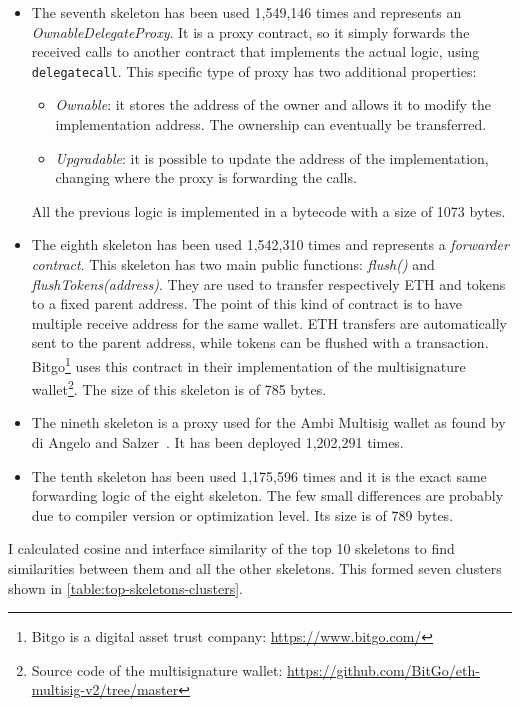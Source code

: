 \begin{itemize}
    \item The seventh skeleton has been used 1,549,146 times and represents an \textit{OwnableDelegateProxy}. It is a proxy contract, so it simply forwards the received calls to another contract that implements the actual logic, using {\tt delegatecall}. This specific type of proxy has two additional properties:
    \begin{itemize}
        \item \textit{Ownable}: it stores the address of the owner and allows it to modify the implementation address. The ownership can eventually be transferred.
        \item \textit{Upgradable}: it is possible to update the address of the implementation, changing where the proxy is forwarding the calls.
    \end{itemize}
    All the previous logic is implemented in a bytecode with a size of 1073 bytes.

    \item The eighth skeleton has been used 1,542,310 times and represents a \textit{forwarder contract}. This skeleton has two main public functions: \textit{flush()} and \textit{flushTokens(address)}. They are used to transfer respectively ETH and tokens to a fixed parent address. The point of this kind of contract is to have multiple receive address for the same wallet. ETH transfers are automatically sent to the parent address, while tokens can be flushed with a transaction. Bitgo\footnote{Bitgo is a digital asset trust company: \url{https://www.bitgo.com/}} uses this contract in their implementation of the multisignature wallet\footnote{Source code of the multisignature wallet: \url{https://github.com/BitGo/eth-multisig-v2/tree/master}}. The size of this skeleton is of 785 bytes.

    \item The nineth skeleton is a proxy used for the Ambi Multisig wallet as found by di Angelo and Salzer~\cite{wallet-contracts}. It has been deployed 1,202,291 times. 

    \item The tenth skeleton has been used 1,175,596 times and it is the exact same forwarding logic of the eight skeleton. The few small differences are probably due to compiler version or optimization level. Its size is of 789 bytes.
    
\end{itemize}

I calculated cosine and interface similarity of the top 10 skeletons to find similarities between them and all the other skeletons. This formed seven clusters shown in \cref{table:top-skeletons-clusters}.

